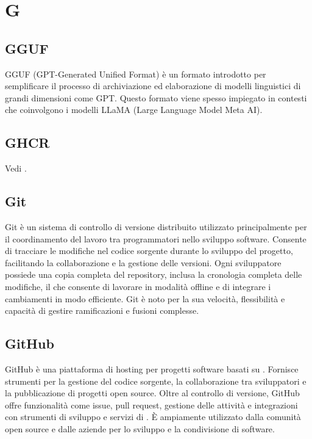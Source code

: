 \section{G}

\vspace{2em}
\subsection*{GGUF}
\par GGUF (GPT-Generated Unified Format) è un formato introdotto per semplificare il processo di archiviazione ed elaborazione di modelli linguistici di grandi dimensioni come GPT. Questo formato viene spesso impiegato in contesti che coinvolgono i modelli LLaMA (Large Language Model Meta AI).

\vspace{2em}
\subsection*{GHCR}
\par Vedi .

\vspace{2em}
\subsection*{Git}
\par Git è un sistema di controllo di versione distribuito utilizzato principalmente per il coordinamento del lavoro tra programmatori nello sviluppo software. Consente di tracciare le modifiche nel codice sorgente durante lo sviluppo del progetto, facilitando la collaborazione e la gestione delle versioni. Ogni sviluppatore possiede una copia completa del repository, inclusa la cronologia completa delle modifiche, il che consente di lavorare in modalità offline e di integrare i cambiamenti in modo efficiente. Git è noto per la sua velocità, flessibilità e capacità di gestire ramificazioni e fusioni complesse.

\vspace{2em}
\subsection*{GitHub}
\par GitHub è una piattaforma di hosting per progetti software basati su . Fornisce strumenti per la gestione del codice sorgente, la collaborazione tra sviluppatori e la pubblicazione di progetti open source. Oltre al controllo di versione, GitHub offre funzionalità come issue, pull request, gestione delle attività e integrazioni con strumenti di sviluppo e servizi di . È ampiamente utilizzato dalla comunità open source e dalle aziende per lo sviluppo e la condivisione di software.

